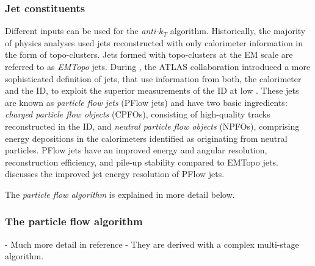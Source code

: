 \subsubsection{Jet constituents}
Different inputs can be used for the \emph{anti-$k_T$} algorithm.
Historically, the majority of physics analyses used jets reconstructed with only calorimeter information in the form of topo-clusters. Jets formed with topo-clusters at the EM scale are referred to as \emph{EMTopo} jets.
During \RunTwo, the ATLAS collaboration introduced a more sophisticated definition of jets, that use information from both, the calorimeter and the ID, to exploit the superior measurements of the ID at low \pT.
These jets are known as \emph{particle flow jets} (PFlow jets) and have two basic ingredients: \emph{charged particle flow objects} (CPFOs), consisting of high-quality tracks reconstructed in the ID, and \emph{neutral particle flow objects} (NPFOs), comprising energy depositions in the calorimeters identified as originating from neutral particles.
PFlow jets have an improved energy and angular resolution, reconstruction efficiency, and pile-up stability compared to EMTopo jets\cite{PERF-2015-09}.
 discusses the improved jet energy resolution of PFlow jets.



The \emph{particle flow algorithm} is explained in more detail below.

\subsubsection{The particle flow algorithm}
- Much more detail in reference
- They are derived with a complex multi-stage algorithm.

